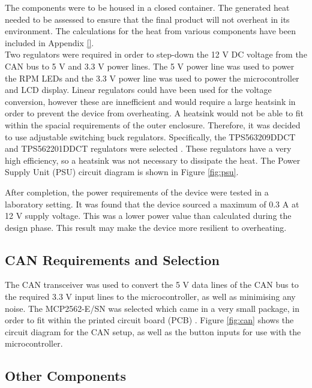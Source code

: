 \documentclass[a4paper,12pt]{article}
\begin{document}
The components were to be housed in a closed container. The generated heat needed to be assessed to ensure that the final product will not overheat in its environment. The calculations for the heat from various components have been included in Appendix \ref{}. \\
 
Two regulators were required in order to step-down the 12 V DC voltage from the CAN bus to 5 V and 3.3 V power lines. The 5 V power line was used to power the RPM LEDs and the 3.3 V power line was used to power the microcontroller and LCD display. Linear regulators could have been used for the voltage conversion, however these are innefficient and would require a large heatsink in order to prevent the device from overheating. A heatsink would not be able to fit within the spacial requirements of the outer enclosure. Therefore, it was decided to use adjustable switching buck regulators. Specifically, the TPS563209DDCT and TPS562201DDCT regulators were selected \cite{psu_1, psu_2}. These regulators have a very high efficiency, so a heatsink was not necessary to dissipate the heat. The Power Supply Unit (PSU) circuit diagram is shown in Figure \ref{fig:psu}.


 
After completion, the power requirements of the device were tested in a laboratory setting. It was found that the device sourced a maximum of 0.3 A at 12 V supply voltage. This was a lower power value than calculated during the design phase. This result may make the device more resilient to overheating.

\subsection{CAN Requirements and Selection}
\label{sec:CAN}

The CAN transceiver was used to convert the 5 V data lines of the CAN bus to the required 3.3 V input lines to the microcontroller, as well as minimising any noise. The MCP2562-E/SN was selected which came in a very small package, in order to fit within the printed circuit board (PCB) \cite{can_transciever}. Figure \ref{fig:can} shows the circuit diagram for the CAN setup, as well as the button inputs for use with the microcontroller. 



\subsection{Other Components}
\label{sec:other_components}
\end{document}
